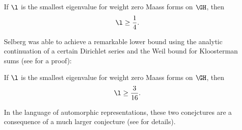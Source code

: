     \begin{conjecture}
      If $\l$ is the smallest eigenvalue for weight zero Maass forms on $\GH$, then
      \[
        \l \ge \frac{1}{4}.
      \]
    \end{conjecture}

    Selberg was able to achieve a remarkable lower bound using the analytic continuation of a certain Dirichlet series and the Weil bound for Kloosterman sums (see \cite{iwaniec2002spectral} for a proof):

    \begin{theorem}
      If $\l$ is the smallest eigenvalue for weight zero Maass forms on $\GH$, then
      \[
        \l \ge \frac{3}{16}.
      \]
    \end{theorem}

    In the language of automorphic representations, these two conejctures are a consequence of a much larger conjecture (see \cite{blomer2013role} for details).